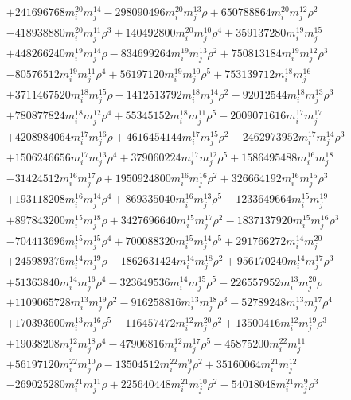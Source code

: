 {\begin{align*}
&+241696768m_i^{20}m_j^{14}-298090496m_i^{20}m_j^{13}\rho+650788864m_i^{20}m_j^{12}\rho^{2}\\
&-418938880m_i^{20}m_j^{11}\rho^{3}+140492800m_i^{20}m_j^{10}\rho^{4}+359137280m_i^{19}m_j^{15}\\
&+448266240m_i^{19}m_j^{14}\rho-834699264m_i^{19}m_j^{13}\rho^{2}+750813184m_i^{19}m_j^{12}\rho^{3}\\
&-80576512m_i^{19}m_j^{11}\rho^{4}+56197120m_i^{19}m_j^{10}\rho^{5}+753139712m_i^{18}m_j^{16}\\
&+3711467520m_i^{18}m_j^{15}\rho-1412513792m_i^{18}m_j^{14}\rho^{2}-92012544m_i^{18}m_j^{13}\rho^{3}\\
&+780877824m_i^{18}m_j^{12}\rho^{4}+55345152m_i^{18}m_j^{11}\rho^{5}-2009071616m_i^{17}m_j^{17}\\
&+4208984064m_i^{17}m_j^{16}\rho+4616454144m_i^{17}m_j^{15}\rho^{2}-2462973952m_i^{17}m_j^{14}\rho^{3}\\
&+1506246656m_i^{17}m_j^{13}\rho^{4}+379060224m_i^{17}m_j^{12}\rho^{5}+1586495488m_i^{16}m_j^{18}\\
&-31424512m_i^{16}m_j^{17}\rho+1950924800m_i^{16}m_j^{16}\rho^{2}+326664192m_i^{16}m_j^{15}\rho^{3}\\
&+193118208m_i^{16}m_j^{14}\rho^{4}+869335040m_i^{16}m_j^{13}\rho^{5}-1233649664m_i^{15}m_j^{19}\\
&+897843200m_i^{15}m_j^{18}\rho+3427696640m_i^{15}m_j^{17}\rho^{2}-1837137920m_i^{15}m_j^{16}\rho^{3}\\
&-704413696m_i^{15}m_j^{15}\rho^{4}+700088320m_i^{15}m_j^{14}\rho^{5}+291766272m_i^{14}m_j^{20}\\
&+245989376m_i^{14}m_j^{19}\rho-1862631424m_i^{14}m_j^{18}\rho^{2}+956170240m_i^{14}m_j^{17}\rho^{3}\\
&+51363840m_i^{14}m_j^{16}\rho^{4}-323649536m_i^{14}m_j^{15}\rho^{5}-226557952m_i^{13}m_j^{20}\rho\\
&+1109065728m_i^{13}m_j^{19}\rho^{2}-916258816m_i^{13}m_j^{18}\rho^{3}-52789248m_i^{13}m_j^{17}\rho^{4}\\
&+170393600m_i^{13}m_j^{16}\rho^{5}-116457472m_i^{12}m_j^{20}\rho^{2}+13500416m_i^{12}m_j^{19}\rho^{3}\\
&+19038208m_i^{12}m_j^{18}\rho^{4}-47906816m_i^{12}m_j^{17}\rho^{5}-45875200m_i^{22}m_j^{11}\\
&+56197120m_i^{22}m_j^{10}\rho-13504512m_i^{22}m_j^{9}\rho^{2}+35160064m_i^{21}m_j^{12}\\
&-269025280m_i^{21}m_j^{11}\rho+225640448m_i^{21}m_j^{10}\rho^{2}-54018048m_i^{21}m_j^{9}\rho^{3}\\

\end{align*}}
